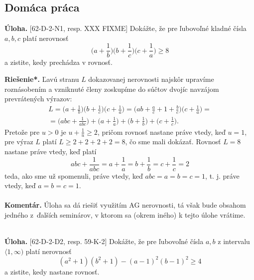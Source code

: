 \documentclass[11pt,a4paper,oneside,final]{book}
\newcommand{\kom}{\textbf{Komentár.} }
\newcommand{\ul}{\textbf{Úloha.} }
\newcommand{\rieh}{\textbf{Riešenie*.} }
\begin{document}
\subsection*{Domáca práca}
\begin{tcolorbox}[breakable,notitle,boxrule=0pt,colback=light-gray,colframe=light-gray]\ul [62-D-2-N1, resp. XXX FIXME]
Dokážte, že pre ľubovoľné kladné čísla $a, b, c$ platí nerovnosť
$$\bigg(a +\frac{1}{b}\bigg)\bigg(b+\frac{1}{c}\bigg)\bigg(c+\frac{1}{a}\bigg)\geq 8$$
a zistite, kedy prechádza v rovnosť.

\end{tcolorbox}

\rieh Ľavú stranu $L$ dokazovanej nerovnosti najskôr upravíme roznásobením a vzniknuté členy zoskupíme do súčtov dvojíc navzájom prevrátených výrazov:
\begin{multline*} L = \bigg(a +\frac{1}{b}\bigg)\bigg(b+\frac{1}{c}\bigg)\bigg(c+\frac{1}{a}\bigg) = \bigg(ab+ \frac{a}{c} + 1 +\frac{b}{c}\bigg) \bigg(c +\frac{1}{a}\bigg)=\\ =\bigg( abc + \frac{1}{abc}\bigg)+\bigg( a+\frac{1}{a}\bigg)+ \bigg(b+\frac{1}{b}\bigg)+\bigg(c+\frac{1}{c}\bigg).\end{multline*}
Pretože pre $u > 0$ je $u+\frac{1}{u}\geq 2$, pričom rovnosť nastane práve vtedy, keď $u = 1$, pre výraz $L$ platí $L \geq 2 + 2 + 2 + 2 = 8$, čo sme mali dokázať. Rovnosť $L = 8$ nastane práve vtedy, keď platí
$$ abc+\frac{1}{abc}=a+\frac{1}{a}=b+\frac{1}{b}=c+\frac{1}{c}=2$$
teda, ako sme už spomenuli, práve vtedy, keď $abc = a = b = c = 1$, t. j. práve vtedy, keď $a = b = c = 1$.\\
\\
\kom Úloha sa dá riešiť využitím AG nerovnosti, tá však bude obsahom jedného z~ďalších seminárov, v ktorom sa (okrem iného) k tejto úlohe vrátime.\\
\\
\begin{tcolorbox}[breakable,notitle,boxrule=0pt,colback=light-gray,colframe=light-gray]\ul [62-D-2-D2, resp. 59-K-2]
Dokážte, že pre ľubovoľné čísla $a, b$ z intervalu $\langle 1, \infty)$ platí nerovnosť
$$ (a^2 + 1)(b^2 + 1) - (a - 1)^2 (b - 1)^2 \geq 4$$
a zistite, kedy nastane rovnosť.

\end{tcolorbox}
\end{document}
